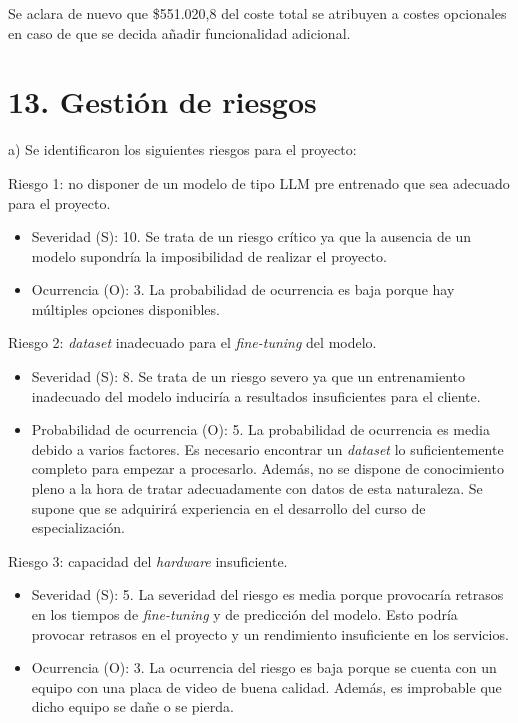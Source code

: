 \documentclass[
11pt, %
]{Clases/charter}
\begin{document}
Se aclara de nuevo que \$551.020,8 del coste total se atribuyen a costes opcionales en caso de que se decida añadir funcionalidad adicional.

\section{13. Gestión de riesgos}
\label{sec:riesgos}
a) Se identificaron los siguientes riesgos para el proyecto:

Riesgo 1: no disponer de un modelo de tipo LLM pre entrenado que sea adecuado para el proyecto.
\begin{itemize}
	\item Severidad (S): 10. Se trata de un riesgo crítico ya que la ausencia de un modelo supondría la imposibilidad de realizar el proyecto.
	\item Ocurrencia (O): 3. La probabilidad de ocurrencia es baja porque hay múltiples opciones disponibles.
\end{itemize}

Riesgo 2: \textit{dataset} inadecuado para el \textit{fine-tuning} del modelo.
\begin{itemize}
	\item Severidad (S): 8. Se trata de un riesgo severo ya que un entrenamiento inadecuado del modelo induciría a resultados insuficientes para el cliente.
	\item Probabilidad de ocurrencia (O): 5. La probabilidad de ocurrencia es media debido a varios factores.
	      Es necesario encontrar un \textit{dataset} lo suficientemente completo para empezar a procesarlo.
	      Además, no se dispone de conocimiento pleno a la hora de tratar adecuadamente con datos de esta naturaleza.
	      Se supone que se adquirirá experiencia en el desarrollo del curso de especialización.
\end{itemize}

\pagebreak

Riesgo 3: capacidad del \textit{hardware} insuficiente.
\begin{itemize}
	\item Severidad (S): 5. La severidad del riesgo es media porque provocaría retrasos en los tiempos de \textit{fine-tuning} y de predicción del modelo.
	      Esto podría provocar retrasos en el proyecto y un rendimiento insuficiente en los servicios.
	\item Ocurrencia (O): 3. La ocurrencia del riesgo es baja porque se cuenta con un equipo con una placa de video de buena calidad.
	      Además, es improbable que dicho equipo se dañe o se pierda.
\end{itemize}
\end{document}
